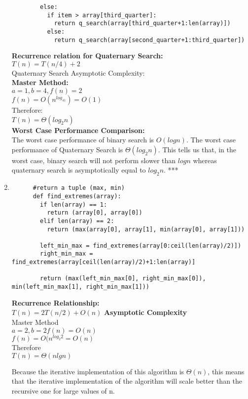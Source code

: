 \documentclass{article}
\begin{document}
\begin{enumerate}
\begin{verbatim}
        else:
          if item > array[third_quarter]:
            return q_search(array[third_quarter+1:len(array)])
          else:
            return q_search(array[second_quarter+1:third_quarter])
    \end{verbatim}
    \textbf{Recurrence relation for Quaternary Search:}\\
      $T(n) = T(n/4) + 2$\\
    Quaternary Search Asymptotic Complexity:\\
    \textbf{Master Method:}\\
    $a=1,b=4,f(n)=2$\\
    $f(n) = O(n^{log_41}) = O(1)$\\
    Therefore:\\
    $T(n) = \Theta(log_2n)$\\
    \textbf{Worst Case Performance Comparison:}\\
    The worst case performance of binary search is $O(logn)$.  The worst case performance of Quaternary Search is $\Theta(log_2n)$.  This tells us that, in the worst case, binary search will not perform slower than $logn$ whereas quaternary search is asymptotically equal to $log_2n$. ***

    \item\begin{verbatim}
      #return a tuple (max, min)
      def find_extremes(array):
        if len(array) == 1:
          return (array[0], array[0])
        elif len(array) == 2:
          return (max(array[0], array[1], min(array[0], array[1]))

        left_min_max = find_extremes(array[0:ceil(len(array)/2)])
        right_min_max = find_extremes(array[ceil(len(array)/2)+1:len(array)]

        return (max(left_min_max[0], right_min_max[0]), min(left_min_max[1], right_min_max[1]))

    \end{verbatim}
    \textbf{Recurrence Relationship:}\\
    $T(n) = 2T(n/2) + O(n)$
    \textbf{Asymptotic Complexity}\\
    Master Method\\
    $a = 2, b=2 f(n)=O(n)$\\
    $f(n) = O(n^{log_2{2}} = O(n)$\\
    Therefore\\
    $T(n) = \Theta(nlgn)$

    Because the iterative implementation of this algorithm is $\Theta(n)$, this means that the iterative implementation of the algorithm will scale better than the recursive one for large values of n.


\end{enumerate}
\end{document}
